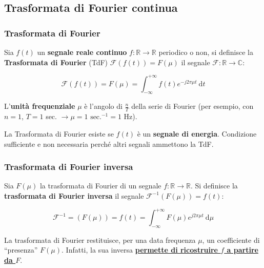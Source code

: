 \documentclass[a4paper]{article}
\newcommand{\dquotes}[1]{``#1''}
\begin{document}
	\newpage
	
	\subsection{Trasformata di Fourier continua} \label{trasformata di fouerier continua}
	
	\subsubsection{Trasformata di Fourier}
	
	Sia $f\left(t\right)$ un \textbf{segnale reale continuo} $f:\mathbb{R} \rightarrow \mathbb{R}$ periodico o non, si definisce la \textcolor{Red3}{\textbf{Trasformata di Fourier}} (TdF) $\mathcal{F}\left(f\left(t\right)\right) = F\left(\mu\right)$ il segnale $\mathcal{F}: \mathbb{R} \rightarrow \mathbb{C}$:
	
	\begin{equation*}
		\mathcal{F}\left(f\left(t\right)\right) = F\left(\mu\right) = \int_{-\infty}^{+\infty} f\left(t\right) e^{-j 2 \pi \mu t} \: \mathrm{d}t
	\end{equation*}

	\noindent
	L'\textbf{unità frequenziale} $\mu$ è l'angolo di $\frac{n}{T}$ della serie di Fourier (per esempio, con $n = 1$, $T = 1$ sec. $\rightarrow \mu = 1 \text{ sec.}^{-1} = 1$ Hz).\newline
	
	\noindent
	La Trasformata di Fourier esiste se $f\left(t\right)$ è un \textbf{segnale di energia}. Condizione sufficiente e non necessaria perché altri segnali ammettono la TdF.
	
	\subsubsection{Trasformata di Fourier inversa}
	
	Sia $F\left(\mu\right)$ la trasformata di Fourier di un segnale $f: \mathbb{R} \rightarrow \mathbb{R}$. Si definisce la \textcolor{Red3}{\textbf{trasformata di Fourier inversa}} il segnale $\mathcal{F}^{-1} \left(F\left(\mu\right)\right) = f\left(t\right)$:
	
	\begin{equation*}
		\mathcal{F}^{-1} = \left(F\left(\mu\right)\right) = f\left(t\right) = \int_{-\infty}^{+\infty} F\left(\mu\right) e^{j 2 \pi \mu t} \: \mathrm{d}\mu
	\end{equation*}

	\noindent
	La trasformata di Fourier restituisce, per una data frequenza $\mu$, un coefficiente di \dquotes{presenza} $F\left(\mu\right)$. Infatti, la sua inversa \textbf{\underline{permette di ricostruire $f$ a partire da $F$}}.
	
\end{document}
